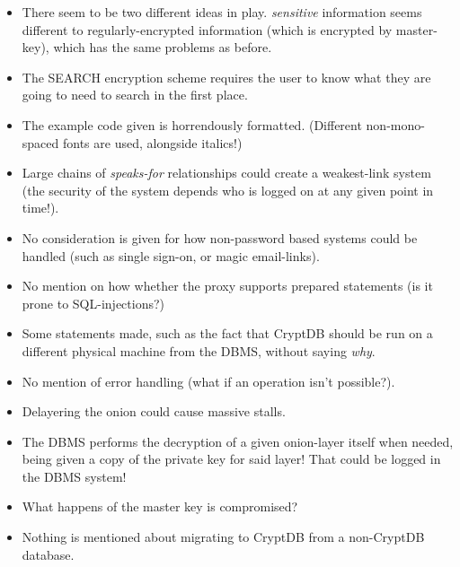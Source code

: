 \documentclass[11pt]{article}
\begin{document}
\begin{itemize}
    \item There seem to be two different ideas in play. \textit{sensitive}
    information seems different to regularly-encrypted information (which is
    encrypted by master-key), which has the same problems as before.

    \item The SEARCH encryption scheme requires the user to know what they are
    going to need to search in the first place.

    \item The example code given is horrendously formatted. (Different
    non-mono-spaced fonts are used, alongside italics!)

    \item Large chains of \textit{speaks-for} relationships could create a
    weakest-link system (the security of the system depends who is logged on at
    any given point in time!).

    \item No consideration is given for how non-password based systems could be
    handled (such as single sign-on, or magic email-links).

    \item No mention on how whether the proxy supports prepared statements (is
    it prone to SQL-injections?)

    \item Some statements made, such as the fact that CryptDB should be run on
    a different physical machine from the DBMS, without saying \textit{why}.

    \item No mention of error handling (what if an operation isn't possible?).

    \item Delayering the onion could cause massive stalls.

    \item The DBMS performs the decryption of a given onion-layer itself when
    needed, being given a copy of the private key for said layer! That could be
    logged in the DBMS system!

    \item What happens of the master key is compromised?

    \item Nothing is mentioned about migrating to CryptDB from a non-CryptDB
    database.

\end{itemize}
\end{document}

